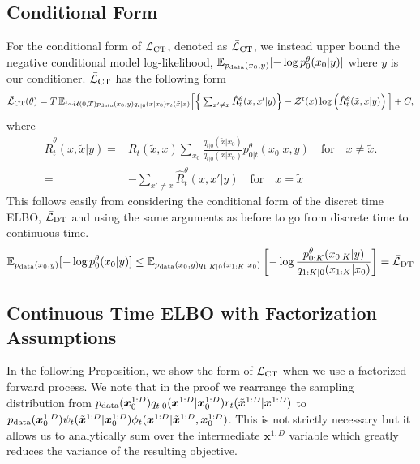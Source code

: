 \documentclass{article}
\begin{document}
\subsection{Conditional Form} \label{sec:ApdxConditionalObjective}
For the conditional form of $\mathcal{L}_{\textup{CT}}$, denoted as $\bar{\mathcal{L}}_{\textup{CT}}$, we instead upper bound the negative conditional model log-likelihood, $\mathbb{E}_{p_{\textup{data}}(x_0, y)} [ - \log p_0^\theta(x_0 | y)]$ where $y$ is our conditioner. $\bar{\mathcal{L}}_{\textup{CT}}$ has the following form
\begin{equation}
   \textstyle \bar{\mathcal{L}}_{\textup{CT}}(\theta) = T \, \mathbb{E}_{t\sim \mathcal{U}(0, T) p_{\textup{data}}(x_0, y) q_{t|0}(x|x_0) r_t(\tilde{x}|x)} \Big[ \Big\{ \sum_{x' \neq x} \hat{R}_t^\theta(x, x' | y) \Big\} - \mathcal{Z}^t(x) \log \left(\hat{R}_t^\theta(\tilde{x}, x | y) \right) \Big] + C,
\end{equation}
where
\begin{align}
    \textstyle \hat{R}_t^\theta(x, \tilde{x}| y) =& R_t(\tilde{x}, x) \sum_{x_0} \frac{q_{t|0}(\tilde{x} | x_0)}{q_{t|0}(x | x_0)} p^\theta_{0|t}(x_0 | x, y) \quad \text{for} \quad x \neq \tilde{x}.\\
    =& -\sum_{x' \neq x} \hat{R}_t^\theta(x, x' | y) \quad \text{for} \quad x = \tilde{x}
\end{align}
This follows easily from considering the conditional form of the discret time ELBO, $\bar{\mathcal{L}}_{\textup{DT}}$ and using the same arguments as before to go from discrete time to continuous time.
\begin{equation}
     \mathbb{E}_{p_{\textup{data}}(x_0, y)} [-\log p_0^\theta(x_0 | y)] \leq \mathbb{E}_{p_{\textup{data}}(x_0, y) q_{1:K|0}(x_{1:K}|x_0)} \left[ - \log \frac{p_{0:K}^\theta(x_{0:K}|y)}{q_{1:K|0}(x_{1:K} | x_0)}\right] = \bar{\mathcal{L}}_{\textup{DT}}
\end{equation}

\subsection{Continuous Time ELBO with Factorization Assumptions} \label{sec:ApdxCTELBOFactorization}
\newcommand{\done}{\psi_t} %
\newcommand{\dtwo}{\phi_t} %
In the following Proposition, we show the form of $\mathcal{L}_{\textup{CT}}$ when we use a factorized forward process. We note that in the proof we rearrange the sampling distribution from $p_{\textup{data}}(\bm{x}_0^{1:D}) q_{t|0}(\bm{x}^{1:D} | \bm{x}_0^{1:D}) r_t(\tilde{\bm{x}}^{1:D} | \bm{x}^{1:D})$ to $\pdata(\bm{x}_0^{1:D}) \done(\tilde{\bm{x}}^{1:D} | \bm{x}_0^{1:D}) \dtwo(\bm{x}^{1:D} | \tilde{\bm{x}}^{1:D}, \bm{x}_0^{1:D})$. This is not strictly necessary but it allows us to analytically sum over the intermediate $\bm{x}^{1:D}$ variable which greatly reduces the variance of the resulting objective.
\end{document}
